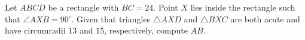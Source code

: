 Let $A B C D$ be a rectangle with $B C=24$. Point $X$ lies inside the rectangle such that $\angle A X B=90^{\circ}$. Given that triangles $\triangle A X D$ and $\triangle B X C$ are both acute and have circumradii $13$ and $15$, respectively, compute $A B$.